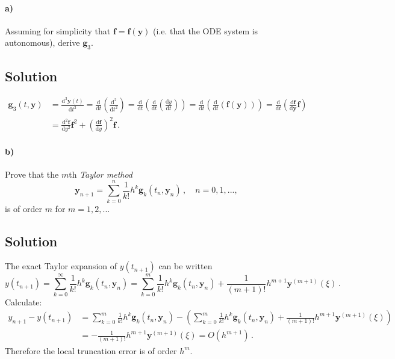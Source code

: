 \documentclass[10pt,letterpaper]{article}
\def\d{\mathrm{d}}
\def\y{\mathbf{y}}
\def\f{\mathbf{f}}
\def\g{\mathbf{g}}
\begin{document}
\paragraph*{a)} Assuming for simplicity that $\f=\f(\y)$ (i.e. that the ODE system is autonomous), derive $\g_3$.
\subsection*{Solution}
\begin{align*}
\g_3(t,\y)&=\frac{\d^3\y(t)}{\d t^3}=\frac{\d}{\d t}\left(\frac{\d^2}{\d t^2}\right)
=\frac{\d}{\d t}\left(\frac{\d}{\d t}\left(\frac{\d y}{\d t}\right)\right)
=\frac{\d}{\d t}\left(\frac{\d}{\d t}(\f(\y))\right)
=\frac{\d}{\d t}\left(\frac{\d\f}{\d\y}\f\right)\\
&=\frac{\d^2\f}{\d y^2}\f^2+\left(\frac{\d\f}{\d y}\right)^2\f\,.
\end{align*}

\paragraph*{b)} Prove that the $m$th \emph{Taylor method}
\[
\y_{n+1}=\sum_{k=0}^n\frac{1}{k!}h^k\g_k(t_n,\y_n)\,,\quad n=0,1,...,
\]
is of order $m$ for $m=1,2,...$
\subsection*{Solution}
The exact Taylor expansion of $y(t_{n+1})$ can be written
\[
y(t_{n+1})=\sum_{k=0}^\infty\frac{1}{k!}h^k\g_k(t_n,\y_n)=\sum_{k=0}^m\frac{1}{k!}h^k\g_k(t_n,\y_n)+\frac{1}{(m+1)!}h^{m+1}\y^{(m+1)}(\xi)\,.
\]
Calculate:
\begin{align*}
y_{n+1}-y(t_{n+1})&=\sum_{k=0}^m\frac{1}{k!}h^k\g_k(t_n,\y_n)-\left(\sum_{k=0}^m\frac{1}{k!}h^k\g_k(t_n,\y_n)+\frac{1}{(m+1)!}h^{m+1}\y^{(m+1)}(\xi)\right)\\
&=-\frac{1}{(m+1)!}h^{m+1}\y^{(m+1)}(\xi)=O(h^{m+1})\,.
\end{align*}
Therefore the local truncation error is of order $h^m$.
\end{document}
